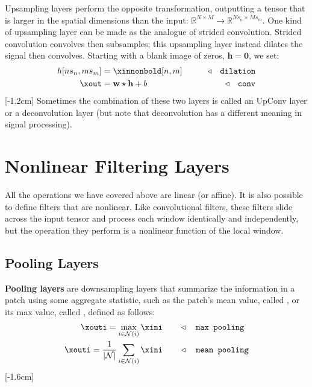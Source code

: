 Upsampling layers perform the opposite transformation, outputting a tensor that is larger in the spatial dimensions than the input: $\mathbb{R}^{N \times M} \rightarrow \mathbb{R}^{Ns_n \times Ms_m}$. One kind of upsampling layer can be made as the analogue of strided convolution. Strided convolution convolves then subsamples; this upsampling layer instead dilates the signal then convolves. Starting with a blank image of zeros, $\mathbf{h} = \mathbf{0}$, we set:
\begin{align}
    h[ns_n, ms_m] &= \xinnonbold[n, m] & \quad\quad \triangleleft \quad \texttt{dilation}\label{eqn:convolutional_neural_nets:dilation}\\
    \xout &= \mathbf{w} \star \mathbf{h} + b & \quad\quad \triangleleft \quad \texttt{conv}
\end{align}
[-1.2cm]
Sometimes the combination of these two layers is called an UpConv layer or a deconvolution layer (but note that deconvolution has a different meaning in signal processing).


\section{Nonlinear Filtering Layers}

All the operations we have covered above are linear (or affine). It is also possible to define filters that are nonlinear. Like convolutional filters, these filters slide across the input tensor and process each window identically and independently, but the operation they perform is a nonlinear function of the local window.

\subsection{Pooling Layers}\label{sec:convolutional_neural_nets:pooling_layers}

{\bf Pooling layers} are downsampling layers that summarize the information in a patch using some aggregate statistic, such as the patch's mean value, called , or its max value, called , defined as follows:
\begin{align}
    \xouti = \max_{i \in \mathcal{N}(i)} \xini & \quad\quad \triangleleft \quad \texttt{max pooling}\label{eqn:convolutional_neural_nets:max_pooling}\\
    \xouti = \frac{1}{|\mathcal{N}|} \sum_{i \in \mathcal{N}(i)} \xini & \quad\quad \triangleleft \quad \texttt{mean pooling}\label{eqn:convolutional_neural_nets:mean_pooling}
\end{align}
[-1.6cm]

